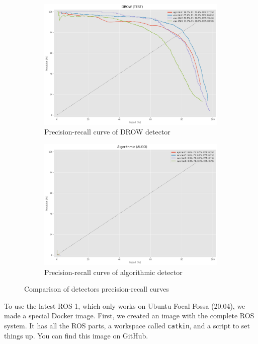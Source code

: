 \documentclass{article}
\begin{document}
\begin{figure}[t!]
	\centering
	\begin{subfigure}{.5\textwidth}
		\centering
		\includegraphics[width=.9\linewidth]{pr_auc_drow}
		\caption{Precision-recall curve of DROW detector}
		\label{fig:pr_auc_drow}
	\end{subfigure}%
	\begin{subfigure}{.5\textwidth}
		\centering
		\includegraphics[width=.9\linewidth]{pr_auc_algo}
		\caption{Precision-recall curve of algorithmic detector}
		\label{fig:pr_auc_algo}
	\end{subfigure}
	\caption{Comparison of detectors precision-recall curves}
	\label{fig:pr_auc_comparison}
\end{figure}

To use the latest ROS 1, which only works on Ubuntu Focal Fossa (20.04), we made a special Docker image.
First, we created an image with the complete ROS system.
It has all the ROS parts, a workspace called \texttt{catkin}\cite{catkin_wiki}, and a script to set things up.
You can find this image on GitHub\cite{FTD_docker_image}.
\end{document}
